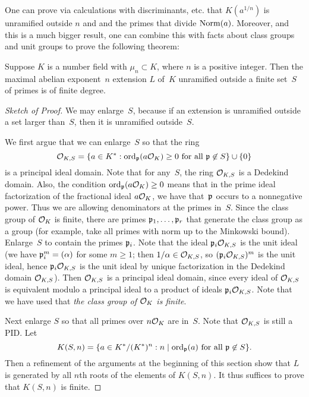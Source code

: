 One can prove via calculations with discriminants, etc. that
$K(a^{1/n})$ is unramified outside $n$ and and the primes that divide
$\operatorname{Norm}(a)$.  Moreover, and this is a much bigger result, one can
combine this with facts about class groups and unit groups to prove
the following theorem:
\begin{theorem}\label{thm:maxunramfin}
	Suppose $K$ is a number field with $\mu_n\subset K$, where $n$ is a
	positive integer.  Then the maximal abelian exponent~$n$ extension $L$
	of~$K$ unramified outside a finite set~$S$ of primes is of finite
	degree.
\end{theorem}
\begin{proof}[Sketch of Proof]
	We may enlarge~$S$, because if an extension is unramified outside
	a set larger than~$S$, then it is unramified outside~$S$.
	
	We first argue that we can enlarge~$S$ so that the ring
	$$
		\mathcal{O}_{K,S} =
			\{
			a \in K^* : \operatorname{ord}_{\mathfrak{p}}(a\mathcal{O}_K) \geq 0 \text{ for all } \mathfrak{p}\not\in S
			\}
			\cup\{0\}
	$$
	is a principal ideal domain.
	Note that for any~$S$, the ring $\mathcal{O}_{K,S}$ is a Dedekind domain.
	Also, the condition $ \operatorname{ord}_{\mathfrak{p}}(a\mathcal{O}_K) \geq 0$
	means that in the prime ideal factorization of the fractional ideal
	$a\mathcal{O}_K$, we have that~$\mathfrak{p}$ occurs to a nonnegative power.  Thus we are
	allowing denominators at the primes in~$S$.  Since the class group of
	$\mathcal{O}_K$ is finite, there are primes $\mathfrak{p}_1,\ldots, \mathfrak{p}_r$ that generate
	the class group as a group (for example, take all primes with norm up to
	the Minkowski bound).  Enlarge~$S$ to contain the primes $\mathfrak{p}_i$.
	Note that the ideal $\mathfrak{p}_i\mathcal{O}_{K,S}$ is the unit ideal (we have
	$\mathfrak{p}_i^m=(\alpha)$ for some $m\geq 1$;  then $1/\alpha \in \mathcal{O}_{K,S}$,
	so $(\mathfrak{p}_i\mathcal{O}_{K,S})^m$ is the unit ideal, hence $\mathfrak{p}_i \mathcal{O}_{K,S}$
	is the unit ideal by unique factorization in the Dedekind
	domain $\mathcal{O}_{K,S}$).
	Then $\mathcal{O}_{K,S}$ is a principal ideal domain, since every ideal
	of $\mathcal{O}_{K,S}$ is equivalent modulo a principal ideal
	to a product of ideals $\mathfrak{p}_i\mathcal{O}_{K,S}$.   Note that we have used
	that {\em the class group of $\mathcal{O}_K$ is finite}.
	
	Next enlarge $S$ so that all primes over $n\mathcal{O}_K$ are in~$S$.
	Note that $\mathcal{O}_{K,S}$ is still a PID.  Let
	$$
	 K(S,n) =
	 	\{
	 	a \in K^*/(K^*)^n : n \mid \operatorname{ord}_{\mathfrak{p}}(a) \text{ for all } \mathfrak{p}\not\in S
	 	\}.
	$$
	Then a refinement of the arguments at the beginning of
	this section show that $L$ is generated by all $n$th roots
	of the elements of $K(S,n)$.  It thus suffices to prove
	that $K(S,n)$ is finite.
	

\end{proof}
